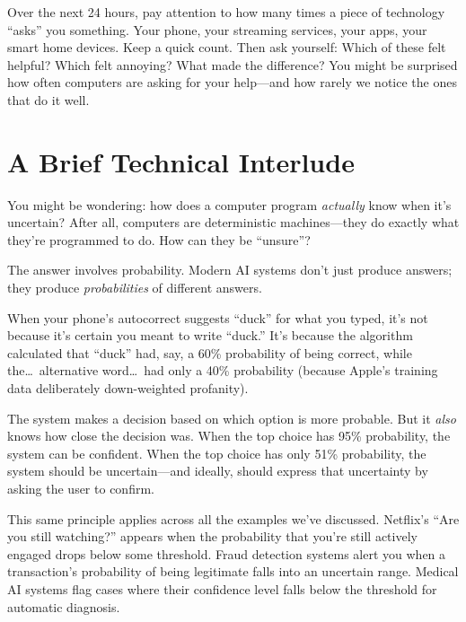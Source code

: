 
\begin{trythis}
Over the next 24 hours, pay attention to how many times a piece of technology ``asks'' you something. Your phone, your streaming services, your apps, your smart home devices. Keep a quick count. Then ask yourself: Which of these felt helpful? Which felt annoying? What made the difference? You might be surprised how often computers are asking for your help---and how rarely we notice the ones that do it well.
\end{trythis}

\section{A Brief Technical Interlude}
\label{sec:technical-interlude}

You might be wondering: how does a computer program \emph{actually} know when it's uncertain? After all, computers are deterministic machines---they do exactly what they're programmed to do. How can they be ``unsure''?

The answer involves probability. Modern AI systems don't just produce answers; they produce \emph{probabilities} of different answers.

When your phone's autocorrect suggests ``duck'' for what you typed, it's not because it's certain you meant to write ``duck.'' It's because the algorithm calculated that ``duck'' had, say, a 60\% probability of being correct, while the\ldots\ alternative word\ldots\ had only a 40\% probability (because Apple's training data deliberately down-weighted profanity).

The system makes a decision based on which option is more probable. But it \emph{also} knows how close the decision was. When the top choice has 95\% probability, the system can be confident. When the top choice has only 51\% probability, the system should be uncertain---and ideally, should express that uncertainty by asking the user to confirm.

This same principle applies across all the examples we've discussed. Netflix's ``Are you still watching?'' appears when the probability that you're still actively engaged drops below some threshold. Fraud detection systems alert you when a transaction's probability of being legitimate falls into an uncertain range. Medical AI systems flag cases where their confidence level falls below the threshold for automatic diagnosis.

